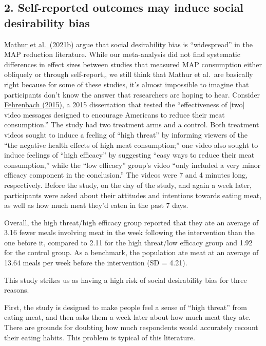 \documentclass[
  letterpaper,
  DIV=11,
  numbers=noendperiod]{scrartcl}
\begin{document}
\subsection{2. Self-reported outcomes may induce social desirability
bias}\label{self-reported-outcomes-may-induce-social-desirability-bias}

\href{https://www.mdpi.com/2072-6643/13/12/4555}{Mathur et al.~(2021b)}
argue that social desirability bias is ``widespread'' in the MAP
reduction literature. While our meta-analysis did not find systematic
differences in effect sizes between studies that measured MAP
consumption either obliquely or through self-report,, we still think
that Mathur et al.~are basically right because for some of these
studies, it's almost impossible to imagine that participants don't know
the answer that researchers are hoping to hear. Consider
\href{https://www.proquest.com/docview/1712399091?fromopenview=true&pq-origsite=gscholar}{Fehrenbach
(2015)}, a 2015 dissertation that tested the ``effectiveness of
{[}two{]} video messages designed to encourage Americans to reduce their
meat consumption.'' The study had two treatment arms and a control. Both
treatment videos sought to induce a feeling of ``high threat'' by
informing viewers of the ``the negative health effects of high meat
consumption;'' one video also sought to induce feelings of ``high
efficacy'' by suggesting ``easy ways to reduce their meat consumption,''
while the ``low efficacy'' group's video ``only included a very minor
efficacy component in the conclusion.'' The videos were 7 and 4 minutes
long, respectively. Before the study, on the day of the study, and again
a week later, participants were asked about their attitudes and
intentions towards eating meat, as well as how much meat they'd eaten in
the past 7 days.

Overall, the high threat/high efficacy group reported that they ate an
average of 3.16 fewer meals involving meat in the week following the
intervention than the one before it, compared to 2.11 for the high
threat/low efficacy group and 1.92 for the control group. As a
benchmark, the population ate meat at an average of 13.64 meals per week
before the intervention (SD = 4.21).

This study strikes us as having a high risk of social desirability bias
for three reasons.

First, the study is designed to make people feel a sense of ``high
threat'' from eating meat, and then asks them a week later about how
much meat they ate. There are grounds for doubting how much respondents
would accurately recount their eating habits. This problem is typical of
this literature.
\end{document}
